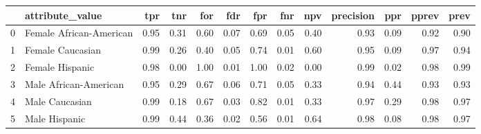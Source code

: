 \begin{tabular}{llrrrrrrrrrrr}
\toprule
{} &          attribute\_value &   tpr &   tnr &   for &   fdr &   fpr &   fnr &   npv &  precision &   ppr &  pprev &  prev \\
\midrule
0 &  Female African-American &  0.95 &  0.31 &  0.60 &  0.07 &  0.69 &  0.05 &  0.40 &       0.93 &  0.09 &   0.92 &  0.90 \\
1 &         Female Caucasian &  0.99 &  0.26 &  0.40 &  0.05 &  0.74 &  0.01 &  0.60 &       0.95 &  0.09 &   0.97 &  0.94 \\
2 &          Female Hispanic &  0.98 &  0.00 &  1.00 &  0.01 &  1.00 &  0.02 &  0.00 &       0.99 &  0.02 &   0.98 &  0.99 \\
3 &    Male African-American &  0.95 &  0.29 &  0.67 &  0.06 &  0.71 &  0.05 &  0.33 &       0.94 &  0.44 &   0.93 &  0.93 \\
4 &           Male Caucasian &  0.99 &  0.18 &  0.67 &  0.03 &  0.82 &  0.01 &  0.33 &       0.97 &  0.29 &   0.98 &  0.97 \\
5 &            Male Hispanic &  0.99 &  0.44 &  0.36 &  0.02 &  0.56 &  0.01 &  0.64 &       0.98 &  0.08 &   0.98 &  0.97 \\
\bottomrule
\end{tabular}
